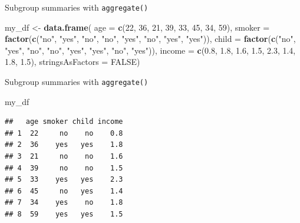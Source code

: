 \documentclass[ignorenonframetext,]{beamer}
\newenvironment{Shaded}{\begin{snugshade}}{\end{snugshade}}
\newcommand{\DataTypeTok}[1]{\textcolor[rgb]{0.13,0.29,0.53}{#1}}
\newcommand{\DecValTok}[1]{\textcolor[rgb]{0.00,0.00,0.81}{#1}}
\newcommand{\FloatTok}[1]{\textcolor[rgb]{0.00,0.00,0.81}{#1}}
\newcommand{\KeywordTok}[1]{\textcolor[rgb]{0.13,0.29,0.53}{\textbf{#1}}}
\newcommand{\NormalTok}[1]{#1}
\newcommand{\OtherTok}[1]{\textcolor[rgb]{0.56,0.35,0.01}{#1}}
\newcommand{\StringTok}[1]{\textcolor[rgb]{0.31,0.60,0.02}{#1}}
\begin{document}
\begin{frame}[fragile]{Subgroup summaries with \texttt{aggregate()}}
\protect\hypertarget{subgroup-summaries-with-aggregate-1}{}

\begin{Shaded}
\begin{Highlighting}[]
\NormalTok{my_df <-}\StringTok{ }\KeywordTok{data.frame}\NormalTok{(}
  \DataTypeTok{age =} \KeywordTok{c}\NormalTok{(}\DecValTok{22}\NormalTok{, }\DecValTok{36}\NormalTok{, }\DecValTok{21}\NormalTok{, }\DecValTok{39}\NormalTok{, }\DecValTok{33}\NormalTok{, }\DecValTok{45}\NormalTok{, }\DecValTok{34}\NormalTok{, }\DecValTok{59}\NormalTok{),}
  \DataTypeTok{smoker =} \KeywordTok{factor}\NormalTok{(}\KeywordTok{c}\NormalTok{(}\StringTok{"no"}\NormalTok{, }\StringTok{"yes"}\NormalTok{, }\StringTok{"no"}\NormalTok{, }\StringTok{"no"}\NormalTok{, }\StringTok{"yes"}\NormalTok{,}
                    \StringTok{"no"}\NormalTok{, }\StringTok{"yes"}\NormalTok{, }\StringTok{"yes"}\NormalTok{)),}
  \DataTypeTok{child =} \KeywordTok{factor}\NormalTok{(}\KeywordTok{c}\NormalTok{(}\StringTok{"no"}\NormalTok{, }\StringTok{"yes"}\NormalTok{, }\StringTok{"no"}\NormalTok{, }\StringTok{"no"}\NormalTok{, }\StringTok{"yes"}\NormalTok{,}
                   \StringTok{"yes"}\NormalTok{, }\StringTok{"no"}\NormalTok{, }\StringTok{"yes"}\NormalTok{)),}
  \DataTypeTok{income =} \KeywordTok{c}\NormalTok{(}\FloatTok{0.8}\NormalTok{, }\FloatTok{1.8}\NormalTok{, }\FloatTok{1.6}\NormalTok{, }\FloatTok{1.5}\NormalTok{, }\FloatTok{2.3}\NormalTok{, }\FloatTok{1.4}\NormalTok{, }\FloatTok{1.8}\NormalTok{, }\FloatTok{1.5}\NormalTok{),}
  \DataTypeTok{stringsAsFactors =} \OtherTok{FALSE}\NormalTok{)}
\end{Highlighting}
\end{Shaded}

\end{frame}

\begin{frame}[fragile]{Subgroup summaries with \texttt{aggregate()}}
\protect\hypertarget{subgroup-summaries-with-aggregate-2}{}

\begin{Shaded}
\begin{Highlighting}[]
\NormalTok{my_df}
\end{Highlighting}
\end{Shaded}

\begin{verbatim}
##   age smoker child income
## 1  22     no    no    0.8
## 2  36    yes   yes    1.8
## 3  21     no    no    1.6
## 4  39     no    no    1.5
## 5  33    yes   yes    2.3
## 6  45     no   yes    1.4
## 7  34    yes    no    1.8
## 8  59    yes   yes    1.5
\end{verbatim}

\end{frame}
\end{document}
